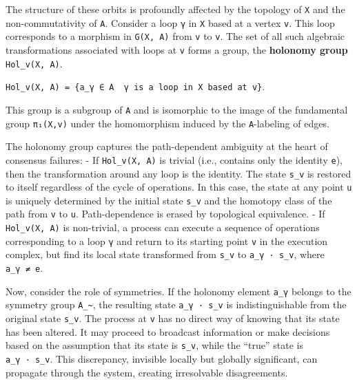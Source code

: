 \documentclass[
]{article}
\begin{document}
The structure of these orbits is profoundly affected by the topology of
\texttt{X} and the non-commutativity of \texttt{A}. Consider a loop
\texttt{γ} in \texttt{X} based at a vertex \texttt{v}. This loop
corresponds to a morphism in \texttt{G(X,\ A)} from \texttt{v} to
\texttt{v}. The set of all such algebraic transformations associated
with loops at \texttt{v} forms a group, the \textbf{holonomy group}
\texttt{Hol\_v(X,\ A)}.

\texttt{Hol\_v(X,\ A)\ =\ \{a\_γ\ ∈\ A\ \textbar{}\ γ\ is\ a\ loop\ in\ X\ based\ at\ v\}}.

This group is a subgroup of \texttt{A} and is isomorphic to the image of
the fundamental group \texttt{π₁(X,v)} under the homomorphism induced by
the \texttt{A}-labeling of edges.

The holonomy group captures the path-dependent ambiguity at the heart of
consensus failures: - If \texttt{Hol\_v(X,\ A)} is trivial (i.e.,
contains only the identity \texttt{e}), then the transformation around
any loop is the identity. The state \texttt{s\_v} is restored to itself
regardless of the cycle of operations. In this case, the state at any
point \texttt{u} is uniquely determined by the initial state
\texttt{s\_v} and the homotopy class of the path from \texttt{v} to
\texttt{u}. Path-dependence is erased by topological equivalence. - If
\texttt{Hol\_v(X,\ A)} is non-trivial, a process can execute a sequence
of operations corresponding to a loop \texttt{γ} and return to its
starting point \texttt{v} in the execution complex, but find its local
state transformed from \texttt{s\_v} to \texttt{a\_γ\ ·\ s\_v}, where
\texttt{a\_γ\ ≠\ e}.

Now, consider the role of symmetries. If the holonomy element
\texttt{a\_γ} belongs to the symmetry group
\texttt{A\_\textasciitilde{}}, the resulting state
\texttt{a\_γ\ ·\ s\_v} is indistinguishable from the original state
\texttt{s\_v}. The process at \texttt{v} has no direct way of knowing
that its state has been altered. It may proceed to broadcast information
or make decisions based on the assumption that its state is
\texttt{s\_v}, while the ``true'' state is \texttt{a\_γ\ ·\ s\_v}. This
discrepancy, invisible locally but globally significant, can propagate
through the system, creating irresolvable disagreements.
\end{document}
